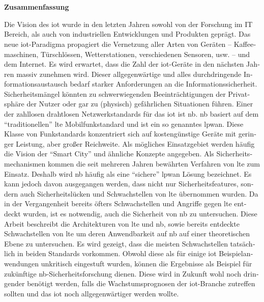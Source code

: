 %
% 

\chapter*{\ }


\begin{otherlanguage}{ngerman}
	\begin{center}
		\begin{large}
			\textbf{Zusammenfassung}
		\end{large}
	\end{center}
	\vspace{0.75em}

	Die Vision des  \ac{iot} wurde in den letzten Jahren sowohl von der Forschung im IT Bereich, als auch von industriellen Entwicklungen und Produkten geprägt.
	Das neue \ac{iot}-Paradigma propagiert die Vernetzung aller Arten von Geräten -- Kaffeemaschinen, Türschlössen, Wetterstationen, verschiedenen Sensoren, usw. -- und dem Internet.
	Es wird erwartet, dass die Zahl der \ac{iot}-Geräte in den nächsten Jahren massiv zunehmen wird.
	Dieser allgegenwärtige und alles durchdringende Informationsaustausch bedarf starker Anforderungen an die Informationssicherheit.
	Sicherheitsmängel könnten zu schwerwiegenden Beeinträchtigungen der Privatsphäre der Nutzer oder gar zu (physisch) gefährlichen Situationen führen.
	Einer der zahllosen drahtlosen Netzwerkstandards für das \ac{iot} ist \ac{nb}.
	\ac{nb} basiert auf dem \enquote{traditionellen} \ac{lte} Mobilfunkstandard und ist ein so  genanntes
	\ac{lpwan}.
	Diese Klasse von Funkstandards konzentriert sich auf kostengünstige Geräte mit geringer Leistung, aber großer Reichweite.
	Als mögliches Einsatzgebiet werden häufig die Vision der \enquote{Smart City} und ähnliche Konzepte angegeben.
	Als Sicherheitsmechanismen kommen die seit mehreren Jahren bewährten Verfahren von \ac{lte} zum Einsatz.
	Deshalb wird \ac{nb} häufig als eine \enquote{sichere} \ac{lpwan} Lösung bezeichnet.
	Es kann jedoch davon ausgegangen werden, dass nicht nur Sicherheitsfeatures, sondern auch Sicherheitslücken und Schwachstellen von \ac{lte} übernommen wurden.
	Da in der Vergangenheit bereits öfters Schwachstellen und Angriffe gegen \ac{lte} entdeckt wurden, ist es notwendig, auch die Sicherheit von \ac{nb} zu untersuchen.
	Diese Arbeit beschreibt die Architekturen von \ac{lte}  und \ac{nb}, sowie bereits entdeckte Schwachstellen von \ac{lte} um deren Anwendbarkeit auf \ac{nb} auf einer theoretischen Ebene zu untersuchen.
	Es wird gezeigt, dass die meisten Schwachstellen tatsächlich in beiden Standards vorkommen.
	Obwohl diese als für einige \ac{iot} Beispielanwendungen unkritisch eingestuft wurden,  können die Ergebnisse als Beispiel für zukünftige \ac{nb}-Sicherheitsforschung dienen.
	Diese wird in Zukunft wohl noch dringender benötigt werden, falls die Wachstumsprognosen der \ac{iot}-Branche zutreffen sollten und das \ac{iot} noch allgegenwärtiger werden wollte.


\end{otherlanguage}
